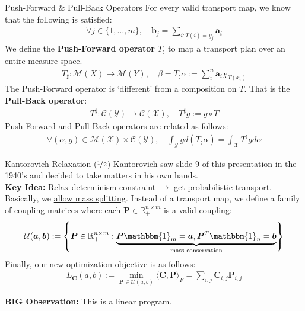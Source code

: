 \documentclass{beamer}
\begin{document}
\begin{frame}{Push-Forward \& Pull-Back Operators}
	For every valid transport map, we know that the following is satisfied:
	\begin{gather}
		\forall j \in \{1, \ldots, m\}, \quad \bm{b}_j = \sum_{i : T(i) = y_j} \bm{a}_i
	\end{gather} \pause
	We define the \textbf{Push-Forward operator} $T_\sharp$ to map a transport plan over an entire measure space.
	\begin{gather}
		T_\sharp: \mathcal{M}(X) \rightarrow \mathcal{M}(Y), \quad \beta = T_\sharp \alpha := \sum_i^n \bm{a}_i \chi_{T(x_i)}
	\end{gather} \pause
	The Push-Forward operator is `different' from a composition on $T$. That is the \textbf{Pull-Back operator}:
	\begin{gather}
		T^\sharp: \mathcal{C}(\mathcal{Y}) \rightarrow \mathcal{C}(\mathcal{X}), \quad T^\sharp g := g \circ T
	\end{gather} \pause
	Push-Forward and Pull-Back operators are related as follows:
	\begin{gather}
		\forall (\alpha, g) \in \mathcal{M}(\mathcal{X}) \times \mathcal{C}(\mathcal{Y}), \quad \int_\mathcal{Y} g d (T_\sharp \alpha) = \int_{\mathcal{X}} T^\sharp g d \alpha
	\end{gather}
\end{frame}

\begin{frame}{Kantorovich Relaxation ($\nicefrac{1}{2}$)}
	Kantorovich saw slide 9 of this presentation in the 1940's and decided to take matters in his own hands. \pause \newline \\

	\textbf{Key Idea:} Relax determinism constraint $\rightarrow$ get probabilistic transport. \pause \newline \\

	Basically, we \underline{allow mass splitting}. \pause Instead of a transport map, we define a family of coupling matrices where each $\bm{P} \in \mathbb{R}^{n \times m}_+$ is a valid coupling:
	\begin{gather}
		\mathcal{U}(\bm{a}, \bm{b}) := \left\{ \bm{P} \in \mathbb{R}^{n \times m}_+ : \underbrace{\bm{P} \mathbbm{1}_m = \bm{a}, \bm{P}^T \mathbbm{1}_n = \bm{b}}_{\text{mass conservation}} \right\}
	\end{gather} \pause
	Finally, our new optimization objective is as follows:
	\begin{gather}
		L_{\bm{C}}(a, b) := \min_{\bm{P} \in \mathcal{U}(a, b)} \langle \bm{C}, \bm{P} \rangle_F = \sum_{i, j} \bm{C}_{i,j} \bm{P}_{i, j}
	\end{gather} \pause

	\textbf{BIG Observation:} This is a linear program.
\end{frame}
\end{document}
